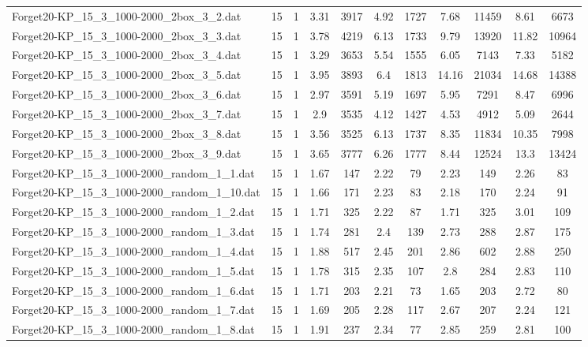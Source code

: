 \begin{table}[!ht]
\begin{tabular}{lcccccccccc}
Forget20-KP\_15\_3\_1000-2000\_2box\_3\_2.dat & 15 & 1 & 3.31 & 3917 & 4.92 & 1727 & 7.68 & 11459 & 8.61 & 6673 \\
Forget20-KP\_15\_3\_1000-2000\_2box\_3\_3.dat & 15 & 1 & 3.78 & 4219 & 6.13 & 1733 & 9.79 & 13920 & 11.82 & 10964 \\
Forget20-KP\_15\_3\_1000-2000\_2box\_3\_4.dat & 15 & 1 & 3.29 & 3653 & 5.54 & 1555 & 6.05 & 7143 & 7.33 & 5182 \\
Forget20-KP\_15\_3\_1000-2000\_2box\_3\_5.dat & 15 & 1 & 3.95 & 3893 & 6.4 & 1813 & 14.16 & 21034 & 14.68 & 14388 \\
Forget20-KP\_15\_3\_1000-2000\_2box\_3\_6.dat & 15 & 1 & 2.97 & 3591 & 5.19 & 1697 & 5.95 & 7291 & 8.47 & 6996 \\
Forget20-KP\_15\_3\_1000-2000\_2box\_3\_7.dat & 15 & 1 & 2.9 & 3535 & 4.12 & 1427 & 4.53 & 4912 & 5.09 & 2644 \\
Forget20-KP\_15\_3\_1000-2000\_2box\_3\_8.dat & 15 & 1 & 3.56 & 3525 & 6.13 & 1737 & 8.35 & 11834 & 10.35 & 7998 \\
Forget20-KP\_15\_3\_1000-2000\_2box\_3\_9.dat & 15 & 1 & 3.65 & 3777 & 6.26 & 1777 & 8.44 & 12524 & 13.3 & 13424 \\
Forget20-KP\_15\_3\_1000-2000\_random\_1\_1.dat & 15 & 1 & 1.67 & 147 & 2.22 & 79 & 2.23 & 149 & 2.26 & 83 \\
Forget20-KP\_15\_3\_1000-2000\_random\_1\_10.dat & 15 & 1 & 1.66 & 171 & 2.23 & 83 & 2.18 & 170 & 2.24 & 91 \\
Forget20-KP\_15\_3\_1000-2000\_random\_1\_2.dat & 15 & 1 & 1.71 & 325 & 2.22 & 87 & 1.71 & 325 & 3.01 & 109 \\
Forget20-KP\_15\_3\_1000-2000\_random\_1\_3.dat & 15 & 1 & 1.74 & 281 & 2.4 & 139 & 2.73 & 288 & 2.87 & 175 \\
Forget20-KP\_15\_3\_1000-2000\_random\_1\_4.dat & 15 & 1 & 1.88 & 517 & 2.45 & 201 & 2.86 & 602 & 2.88 & 250 \\
Forget20-KP\_15\_3\_1000-2000\_random\_1\_5.dat & 15 & 1 & 1.78 & 315 & 2.35 & 107 & 2.8 & 284 & 2.83 & 110 \\
Forget20-KP\_15\_3\_1000-2000\_random\_1\_6.dat & 15 & 1 & 1.71 & 203 & 2.21 & 73 & 1.65 & 203 & 2.72 & 80 \\
Forget20-KP\_15\_3\_1000-2000\_random\_1\_7.dat & 15 & 1 & 1.69 & 205 & 2.28 & 117 & 2.67 & 207 & 2.24 & 121 \\
Forget20-KP\_15\_3\_1000-2000\_random\_1\_8.dat & 15 & 1 & 1.91 & 237 & 2.34 & 77 & 2.85 & 259 & 2.81 & 100 \\

\end{tabular}
\end{table}
